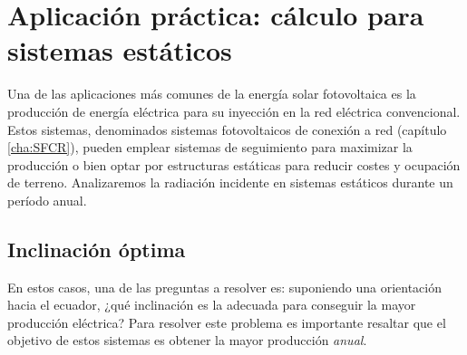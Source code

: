 \section{Aplicación práctica: cálculo para sistemas estáticos}

Una de las aplicaciones más comunes de la energía solar fotovoltaica
es la producción de energía eléctrica para su inyección en la red
eléctrica convencional. Estos sistemas, denominados sistemas fotovoltaicos
de conexión a red (capítulo \ref{cha:SFCR}), pueden emplear sistemas
de seguimiento para maximizar la producción o bien optar por estructuras
estáticas para reducir costes y ocupación de terreno. Analizaremos
la radiación incidente en sistemas estáticos durante un período anual.


\subsection{Inclinación óptima}

En estos casos, una de las preguntas a resolver es: suponiendo una
orientación hacia el ecuador, ¿qué inclinación es la adecuada para
conseguir la mayor producción eléctrica? Para resolver este problema
es importante resaltar que el objetivo de estos sistemas es obtener
la mayor producción \emph{anual}. 




